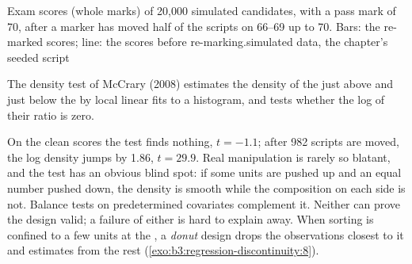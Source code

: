 \begin{omchart}{Exam scores (whole marks) of 20{,}000 simulated candidates, with
a pass mark of 70, after a marker has moved half of the scripts on 66--69 up to
70. Bars: the re-marked scores; line: the scores before re-marking.}{simulated
data, the chapter's seeded script}
\end{omchart}

The density test of McCrary (2008) estimates the density of the 
just above and just below the  by local linear fits to a histogram, and
tests whether the log of their ratio is zero.

\label{lst:b3:regression-discontinuity:density}

\label{out:b3:regression-discontinuity:density}

On the clean scores the test finds nothing, $t = -1.1$; after 982 scripts are
moved, the log density jumps by 1.86, $t = 29.9$. %
Real manipulation is rarely so blatant, and the test has an obvious blind
spot: if some units are pushed up and an equal number pushed down, the density
is smooth while the composition on each side is not. Balance tests on
predetermined covariates complement it. Neither can prove the design valid; a
failure of either is hard to explain away. When sorting is confined to a few
units at the , a \emph{donut} design drops the observations closest to it
and estimates from the rest (\cref{exo:b3:regression-discontinuity:8}).

